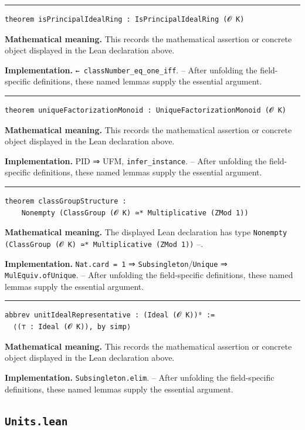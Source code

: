 \documentclass[UTF8,a4paper,11pt,fontset=fandol]{ctexart}
\theoremstyle{definition}
\newcommand{\statementsep}{\par\medskip\hrule\medskip}
\begin{document}
\statementsep
\begin{verbatim}
theorem isPrincipalIdealRing : IsPrincipalIdealRing (𝓞 K)
\end{verbatim}
\noindent\textbf{Mathematical meaning.} This records the mathematical assertion or concrete object displayed in the Lean declaration above.\par
\noindent\textbf{Implementation.} \texttt{← classNumber\_\allowbreak{}eq\_\allowbreak{}one\_\allowbreak{}iff}. -- After unfolding the field-specific definitions, these named lemmas supply the essential argument.\par
\statementsep
\begin{verbatim}
theorem uniqueFactorizationMonoid : UniqueFactorizationMonoid (𝓞 K)
\end{verbatim}
\noindent\textbf{Mathematical meaning.} This records the mathematical assertion or concrete object displayed in the Lean declaration above.\par
\noindent\textbf{Implementation.} PID ⇒ UFM, \texttt{infer\_\allowbreak{}instance}. -- After unfolding the field-specific definitions, these named lemmas supply the essential argument.\par
\statementsep
\begin{verbatim}
theorem classGroupStructure :
    Nonempty (ClassGroup (𝓞 K) ≃* Multiplicative (ZMod 1))
\end{verbatim}
\noindent\textbf{Mathematical meaning.} The displayed Lean declaration has type \texttt{Nonempty (ClassGroup (𝓞 K) ≃* Multiplicative (ZMod 1))} --.\par
\noindent\textbf{Implementation.} \texttt{Nat.\allowbreak{}card = 1} ⇒ \texttt{Subsingleton}/\texttt{Unique} ⇒ \texttt{MulEquiv.\allowbreak{}ofUnique}. -- After unfolding the field-specific definitions, these named lemmas supply the essential argument.\par
\statementsep
\begin{verbatim}
abbrev unitIdealRepresentative : (Ideal (𝓞 K))⁰ :=
  ⟨(⊤ : Ideal (𝓞 K)), by simp⟩
\end{verbatim}
\noindent\textbf{Mathematical meaning.} This records the mathematical assertion or concrete object displayed in the Lean declaration above.\par
\noindent\textbf{Implementation.} \texttt{Subsingleton.\allowbreak{}elim}. -- After unfolding the field-specific definitions, these named lemmas supply the essential argument.\par

\subsection{\texttt{Units.lean}}
\end{document}

